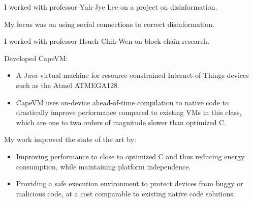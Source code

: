 \documentclass[10pt,a4paper]{../altacv}
\begin{document}
\medskip




\medskip\medskip{}

I worked with professor Yuh-Jye Lee on a project on disinformation.

My focus was on using social connections to correct disinformation.

\medskip



\newpage
{\marginpar{\vspace*{\dimexpr1pt-\baselineskip}\raggedright}}


I worked with professor Hsueh Chih-Wen on block chain research.

\medskip




\medskip\medskip{}

Developed CapeVM:
\begin{itemize}
    \item\small{A Java virtual machine for resource-constrained Internet-of-Things devices such as the Atmel ATMEGA128.}
    \item\small{CapeVM uses on-device ahead-of-time compilation to native code to drastically improve performance compared to existing VMs in this class, which are one to two orders of magnitude slower than optimized C.}
\end{itemize}

My work improved the state of the art by:
\begin{itemize}
    \item\small{Improving performance to close to optimized C and thus reducing energy consumption, while maintaining platform independence.}
    \item\small{Providing a safe execution environment to protect devices from buggy or malicious code, at a cost comparable to existing native code solutions.}
\end{itemize}
\end{document}
